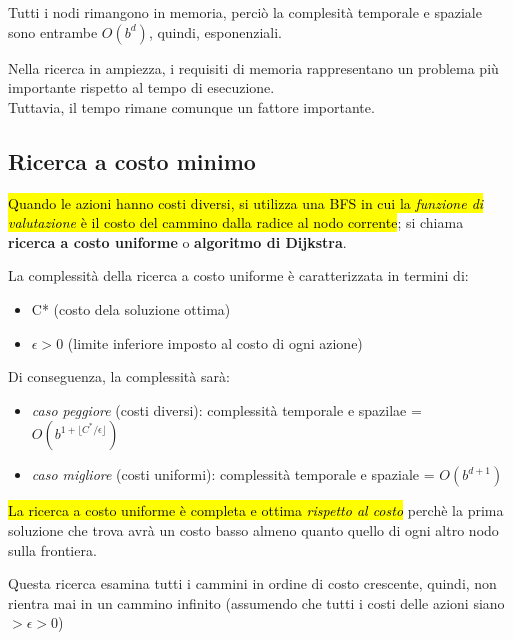 \documentclass[12pt, a4paper, oneside]{book}
\begin{document}
    Tutti i nodi rimangono in memoria, perciò la complesità temporale e spaziale sono entrambe $O(b^d)$, quindi, esponenziali.

    Nella ricerca in ampiezza, i requisiti di memoria rappresentano un problema più importante rispetto al tempo di esecuzione. \\[0.2ex]
    Tuttavia, il tempo rimane comunque un fattore importante.


    \subsection{Ricerca a costo minimo}
    \hl{Quando le azioni hanno costi diversi, si utilizza una BFS in cui la \textit{funzione di valutazione} è il costo del cammino dalla radice al nodo corrente}; si chiama \textbf{ricerca a costo uniforme} o \textbf{algoritmo di Dijkstra}.


    La complessità della ricerca a costo uniforme è caratterizzata in termini di:
    \begin{itemize}
      \item C* (costo dela soluzione ottima)
      \item $\epsilon > 0$ (limite inferiore imposto al costo di ogni azione)
    \end{itemize}

    Di conseguenza, la complessità sarà:
    \begin{itemize}
      \item \textit{caso peggiore} (costi diversi): complessità temporale e spazilae = $O(b^{1 + \lfloor C^*/\epsilon \rfloor})$
      \item \textit{caso migliore} (costi uniformi): complessità temporale e spaziale = $O(b^{d+1})$
    \end{itemize}

    \hl{La ricerca a costo uniforme è completa e ottima \textit{rispetto al costo}} perchè la prima soluzione che trova avrà un costo basso almeno quanto quello di ogni altro nodo sulla frontiera.

    Questa ricerca esamina tutti i cammini in ordine di costo crescente, quindi, non rientra mai in un cammino infinito (assumendo che tutti i costi delle azioni siano $> \epsilon > 0$)
\end{document}
